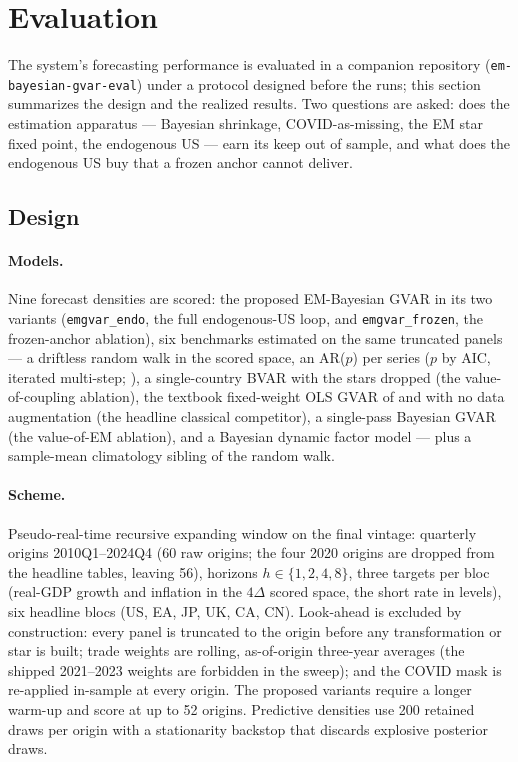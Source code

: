 \documentclass[11pt]{article}
\theoremstyle{plain}
\theoremstyle{remark}
\begin{document}
\section{Evaluation}\label{sec:eval}

The system's forecasting performance is evaluated in a companion
repository (\texttt{em-bayesian-gvar-eval}) under a protocol designed
before the runs; this section summarizes the design and the realized
results. Two questions are asked: does the estimation apparatus ---
Bayesian shrinkage, COVID-as-missing, the EM star fixed point, the
endogenous US --- earn its keep out of sample, and what does the
endogenous US buy that a frozen anchor cannot deliver.

\subsection{Design}\label{sec:oosdesign}

\paragraph{Models.} Nine forecast densities are scored: the proposed
EM-Bayesian GVAR in its two variants (\texttt{emgvar\_endo}, the full
endogenous-US loop, and \texttt{emgvar\_frozen}, the frozen-anchor
ablation), six benchmarks estimated on the same truncated panels --- a
driftless random walk in the scored space, an AR($p$) per series
($p$ by AIC, iterated multi-step; \citealp{MarcellinoStockWatson2006}),
a single-country BVAR with the stars dropped (the value-of-coupling
ablation), the textbook fixed-weight OLS GVAR of
\citet{PesaranSchuermannWeiner2004} and
\citet{DeesDiMauroPesaranSmith2007} with no data augmentation (the
headline classical competitor), a single-pass Bayesian GVAR (the
value-of-EM ablation), and a Bayesian dynamic factor model --- plus a
sample-mean climatology sibling of the random walk.

\paragraph{Scheme.} Pseudo-real-time recursive expanding window on the
final vintage: quarterly origins 2010Q1--2024Q4 (60 raw origins; the
four 2020 origins are dropped from the headline tables, leaving 56),
horizons $h \in \{1,2,4,8\}$, three targets per bloc (real-GDP growth
and inflation in the $4\Delta$ scored space, the short rate in levels),
six headline blocs (US, EA, JP, UK, CA, CN). Look-ahead is excluded by
construction: every panel is truncated to the origin before any
transformation or star is built; trade weights are rolling, as-of-origin
three-year averages (the shipped 2021--2023 weights are forbidden in the
sweep); and the COVID mask is re-applied in-sample at every origin. The
proposed variants require a longer warm-up and score at up to 52
origins. Predictive densities use 200 retained draws per origin with a
stationarity backstop that discards explosive posterior draws.
\end{document}
